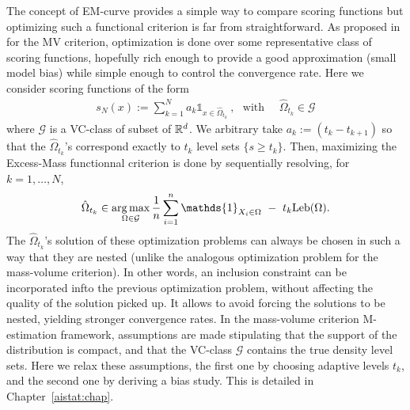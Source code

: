 The concept of EM-curve provides a simple way to compare scoring functions but optimizing such a functional criterion is far from straightforward. As proposed in \cite{CLEM13} for the MV criterion,
optimization is done over some representative class of scoring functions, hopefully rich enough to provide a good approximation (small model bias) while simple enough to control the convergence rate. Here we consider scoring functions of the form
\begin{align*}
s_N(x):= \sum_{k=1}^N a_k \mathds{1}_{x \in \hat{\Omega}_{t_k} }~, ~~~\text{with ~~~} \hat{\Omega}_{t_k}  \in \mathcal{G}
\end{align*}
where $\mathcal{G}$ is a VC-class of subset of $\mathbb{R}^d$.
We arbitrary take $a_k:= (t_k-t_{k+1})$ so that the $\hat{\Omega}_{t_k}$'s correspond exactly to $t_k$ level sets $\{s \ge t_k\}$. Then, maximizing the Excess-Mass functionnal criterion is done by sequentially resolving, for $k=1,\ldots,N$,
\begin{align*}
\hat \Omega_{t_k} \in \argmax_{\Omega \in \mathcal{G}} \frac{1}{n}\sum_{i=1}^n\mathds{1}_{X_i \in \Omega}~-~t_k \leb(\Omega).
\end{align*}
The $\hat \Omega_{t_k}$'s solution of these optimization problems can always be chosen in such a way that they are nested (unlike the analogous optimization problem for the mass-volume criterion). In other words, an inclusion constraint can be incorporated infto the previous optimization problem, without affecting the quality of the solution picked up. It allows to avoid forcing the solutions to be nested, yielding stronger convergence rates.
In the mass-volume criterion M-estimation framework, assumptions are made stipulating that the support of the distribution is compact, and that the VC-class $\mathcal{G}$ contains the true density level sets. Here we relax these assumptions, the first one by choosing adaptive levels $t_k$, and the second one by deriving a bias study. This is detailed in Chapter~\ref{aistat:chap}.
